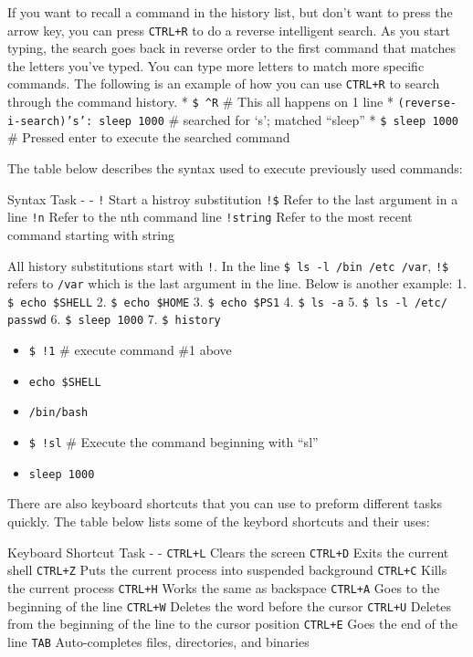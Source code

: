 If you want to recall a command in the history list, but don't want to
press the arrow key, you can press \texttt{CTRL+R} to do a reverse
intelligent search. As you start typing, the search goes back in reverse
order to the first command that matches the letters you've typed. You
can type more letters to match more specific commands. The following is
an example of how you can use \texttt{CTRL+R} to search through the
command history. * \texttt{\$ \^{}R} \# This all happens on 1 line *
\texttt{(reverse-i-search)'s': sleep 1000} \# searched for `s'; matched
``sleep'' * \texttt{\$ sleep 1000} \# Pressed enter to execute the
searched command

The table below describes the syntax used to execute previously used
commands:

Syntax \textbar{} Task - \textbar{} - \texttt{!} \textbar{} Start a
histroy substitution \texttt{!\$} \textbar{} Refer to the last argument
in a line \texttt{!n} \textbar{} Refer to the nth command line
\texttt{!string} \textbar{} Refer to the most recent command starting
with string

All history substitutions start with \texttt{!}. In the line
\texttt{\$ ls -l /bin /etc /var}, \texttt{!\$} refers to \texttt{/var}
which is the last argument in the line. Below is another example: 1.
\texttt{\$ echo \$SHELL} 2. \texttt{\$ echo \$HOME} 3.
\texttt{\$ echo \$PS1} 4. \texttt{\$ ls -a} 5.
\texttt{\$ ls -l /etc/ passwd} 6. \texttt{\$ sleep 1000} 7.
\texttt{\$ history}

\begin{itemize}
\itemsep1pt\parskip0pt
\item
  \texttt{\$ !1} \# execute command \#1 above
\item
  \texttt{echo \$SHELL}
\item
  \texttt{/bin/bash}
\item
  \texttt{\$ !sl} \# Execute the command beginning with ``sl''
\item
  \texttt{sleep 1000}
\end{itemize}

There are also keyboard shortcuts that you can use to preform different
tasks quickly. The table below lists some of the keybord shortcuts and
their uses:

Keyboard Shortcut \textbar{} Task - \textbar{} - \texttt{CTRL+L}
\textbar{} Clears the screen \texttt{CTRL+D} \textbar{} Exits the
current shell \texttt{CTRL+Z} \textbar{} Puts the current process into
suspended background \texttt{CTRL+C} \textbar{} Kills the current
process \texttt{CTRL+H} \textbar{} Works the same as backspace
\texttt{CTRL+A} \textbar{} Goes to the beginning of the line
\texttt{CTRL+W} \textbar{} Deletes the word before the cursor
\texttt{CTRL+U} \textbar{} Deletes from the beginning of the line to the
cursor position \texttt{CTRL+E} \textbar{} Goes the end of the line
\texttt{TAB} \textbar{} Auto-completes files, directories, and binaries

